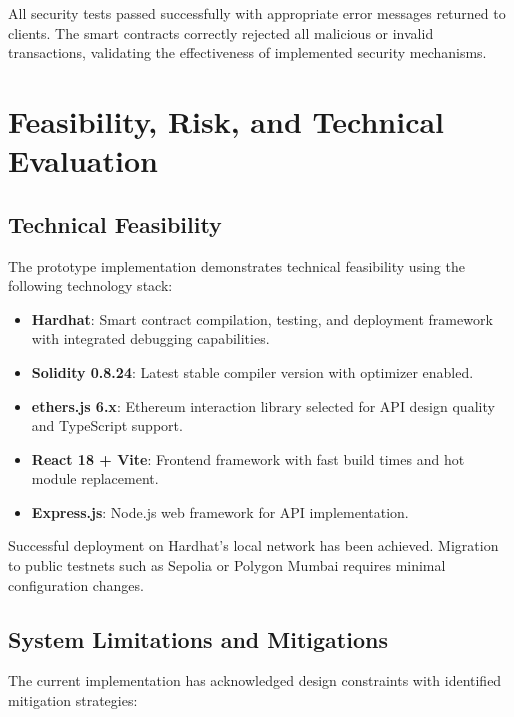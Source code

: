 \documentclass[conference]{IEEEtran}
\begin{document}
All security tests passed successfully with appropriate error messages returned to clients. The smart contracts correctly rejected all malicious or invalid transactions, validating the effectiveness of implemented security mechanisms.

\section{Feasibility, Risk, and Technical Evaluation}

\subsection{Technical Feasibility}

The prototype implementation demonstrates technical feasibility using the following technology stack:

\begin{itemize}
    \item \textbf{Hardhat}: Smart contract compilation, testing, and deployment framework with integrated debugging capabilities.
    \item \textbf{Solidity 0.8.24}: Latest stable compiler version with optimizer enabled.
    \item \textbf{ethers.js 6.x}: Ethereum interaction library selected for API design quality and TypeScript support.
    \item \textbf{React 18 + Vite}: Frontend framework with fast build times and hot module replacement.
    \item \textbf{Express.js}: Node.js web framework for API implementation.
\end{itemize}

Successful deployment on Hardhat's local network has been achieved. Migration to public testnets such as Sepolia or Polygon Mumbai requires minimal configuration changes.

\subsection{System Limitations and Mitigations}

The current implementation has acknowledged design constraints with identified mitigation strategies:
\end{document}
